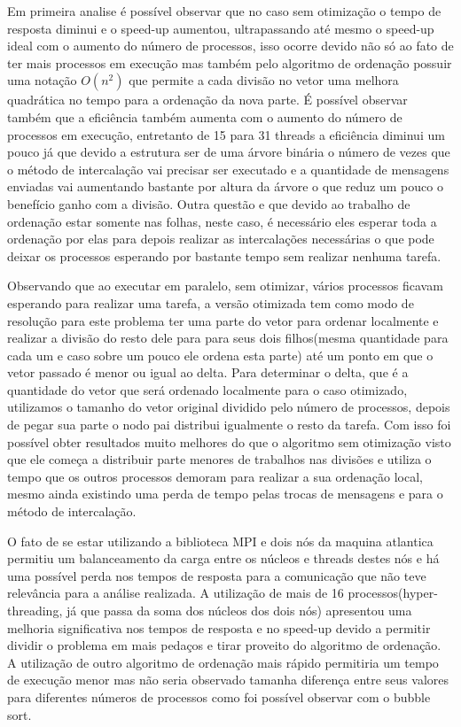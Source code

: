 \documentclass[9pt]{IEEEtran}
\begin{document}
Em primeira analise é possível observar que no caso sem otimização o tempo de
resposta diminui e o speed-up aumentou, ultrapassando até mesmo o speed-up ideal
com o aumento do número de processos, isso ocorre devido não só ao fato de ter
mais processos em execução mas também pelo algoritmo de ordenação possuir uma
notação $O(n^2)$ que permite a cada divisão no vetor uma melhora quadrática no
tempo para a ordenação da nova parte. É possível observar também que a
eficiência também aumenta com o aumento do número de processos em execução,
entretanto de 15 para 31 threads a eficiência diminui um pouco já que devido a
estrutura ser de uma árvore binária o número de vezes que o método de
intercalação vai precisar ser executado e a quantidade de mensagens enviadas vai
aumentando bastante por altura da árvore o que reduz um pouco o benefício ganho
com a divisão. Outra questão e que devido ao trabalho de ordenação estar somente
nas folhas, neste caso, é necessário eles esperar toda a ordenação por elas para
depois realizar as intercalações necessárias o que pode deixar os processos
esperando por bastante tempo sem realizar nenhuma tarefa.

Observando que ao executar em paralelo, sem otimizar, vários processos ficavam
esperando para realizar uma tarefa, a versão otimizada tem como modo de
resolução para este problema ter uma parte do vetor para ordenar localmente e
realizar a divisão do resto dele para para seus dois filhos(mesma quantidade
para cada um e caso sobre um pouco ele ordena esta parte) até um ponto em que o
vetor passado é menor ou igual ao delta. Para determinar o delta, que é a
quantidade do vetor que será ordenado localmente para o caso otimizado,
utilizamos o tamanho do vetor original dividido pelo número de processos, depois
de pegar sua parte o nodo pai distribui igualmente o resto da tarefa. Com isso
foi possível obter resultados muito melhores do que o algoritmo sem otimização
visto que ele começa a distribuir parte menores de trabalhos nas divisões e
utiliza o tempo que os outros processos  demoram para realizar a sua ordenação
local, mesmo ainda existindo uma perda de tempo pelas trocas de mensagens e para
o método de intercalação.

O fato de se estar utilizando a biblioteca MPI e dois nós da maquina atlantica
permitiu um balanceamento da carga entre os núcleos e threads destes nós e há
uma possível perda nos tempos de resposta para a comunicação que não teve
relevância para a análise realizada. A utilização de mais de 16
processos(hyper-threading, já que passa da soma dos núcleos dos dois nós)
apresentou uma melhoria significativa nos tempos de resposta e no speed-up
devido a permitir dividir o problema em mais pedaços e tirar proveito do
algoritmo de ordenação. A utilização de outro algoritmo de ordenação mais rápido
permitiria um tempo de execução menor mas não seria observado tamanha diferença
entre seus valores para diferentes números de processos como foi possível
observar com o bubble sort.
\end{document}
